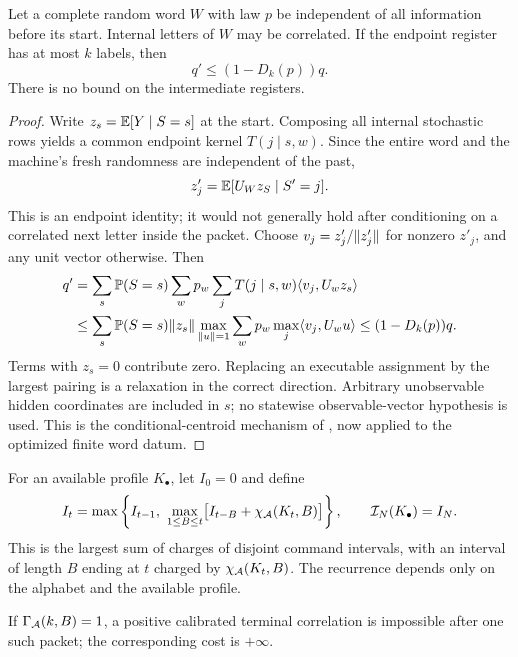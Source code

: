 \begin{lemma}\label{lem:packet}
Let a complete random word $W$ with law $p$ be independent of all information before its start. Internal letters of $W$ may be correlated. If the endpoint register has at most $k$ labels, then
\begin{equation}\label{eq:packet-contraction}
                       q'\le(1-D_k(p))q.
\end{equation}
There is no bound on the intermediate registers.
\end{lemma}
\begin{proof}
Write $z_s=\mathbb E[Y\mid S=s]$ at the start. Composing all internal stochastic rows yields a common endpoint kernel $T(j\mid s,w)$. Since the entire word and the machine's fresh randomness are independent of the past,
\[
 z'_j=\mathbb E[U_Wz_S\mid S'=j].
\]
This is an endpoint identity; it would not generally hold after conditioning on a correlated next letter inside the packet. Choose $v_j=z'_j/\lVert z'_j\rVert$ for nonzero $z'_j$, and any unit vector otherwise. Then
\begin{align*}
 q'&=\sum_s\mathbb P(S=s)\sum_w p_w\sum_jT(j\mid s,w)\langle v_j,U_wz_s\rangle\\
 &\le\sum_s\mathbb P(S=s)\lVert z_s\rVert
       \max_{\lVert u\rVert=1}\sum_w p_w\max_j\langle v_j,U_wu\rangle
 \le(1-D_k(p))q.
\end{align*}
Terms with $z_s=0$ contribute zero. Replacing an executable assignment by the largest pairing is a relaxation in the correct direction. Arbitrary unobservable hidden coordinates are included in $s$; no statewise observable-vector hypothesis is used. This is the conditional-centroid mechanism of \cite{GTF35,GTF42}, now applied to the optimized finite word datum.
\end{proof}

For an available profile $K_\bullet$, let $I_0=0$ and define
\begin{equation}\label{eq:interval-recursion}
 I_t=\max\left\{I_{t-1},\ 
        \max_{1\le B\le t}\bigl[I_{t-B}+\chi_{\calA}(K_t,B)\bigr]\right\},
 \qquad \mathcal I_N(K_\bullet)=I_N.
\end{equation}
This is the largest sum of charges of disjoint command intervals, with an interval of length $B$ ending at $t$ charged by $\chi_{\mathcal A}(K_t,B)$. The recurrence depends only on the alphabet and the available profile.

If $\Gamma_{\mathcal A}(k,B)=1$, a positive calibrated terminal correlation is impossible after one such packet; the corresponding cost is $+\infty$.

